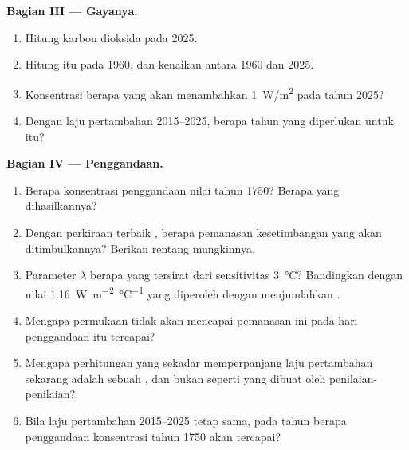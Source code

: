 \begin{problem}
\medskip
\noindent\textbf{Bagian III --- Gayanya.}
\begin{enumerate}[resume]
  \item Hitung  karbon dioksida pada 2025.
  \item Hitung  itu pada 1960, dan kenaikan  antara 1960 dan 2025.
  \item Konsentrasi berapa yang akan menambahkan \qty{1}{W/m^2} pada 
        tahun 2025?
  \item Dengan laju pertambahan 2015--2025, berapa tahun yang diperlukan untuk
        itu?
\end{enumerate}

\medskip
\noindent\textbf{Bagian IV --- Penggandaan.}
\begin{enumerate}[resume]
  \item Berapa konsentrasi penggandaan nilai tahun 1750? Berapa  yang
        dihasilkannya?
  \item Dengan perkiraan terbaik , berapa
        pemanasan kesetimbangan yang akan ditimbulkannya? Berikan rentang
        mungkinnya.
  \item Parameter  $\lambda$ berapa yang tersirat dari sensitivitas
        \qty{3}{\degreeCelsius}? Bandingkan dengan nilai
        \qty{1.16}{W.m^{-2}.\degreeCelsius^{-1}} yang diperoleh dengan
        menjumlahkan .
  \item Mengapa permukaan tidak akan mencapai pemanasan ini pada hari
        penggandaan itu tercapai?
  \item Mengapa perhitungan yang sekadar memperpanjang laju pertambahan
        sekarang adalah sebuah , dan bukan  seperti yang dibuat
        oleh penilaian-penilaian?
  \item Bila laju pertambahan 2015--2025 tetap sama, pada tahun berapa
        penggandaan konsentrasi tahun 1750 akan tercapai?
\end{enumerate}
\end{problem}
